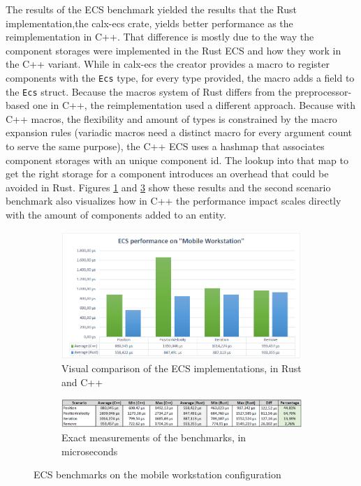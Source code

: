 The results of the \ac{ECS} benchmark yielded the results that the Rust implementation,the calx-ecs crate, yields better performance as the reimplementation in C++. That difference is mostly due to the way the component storages were implemented in the Rust \ac{ECS} and how they work in the C++ variant. While in calx-ecs the creator provides a macro to register components with the \texttt{Ecs} type, for every type provided, the macro adds a field to the \texttt{Ecs} struct. Because the macros system of Rust differs from the preprocessor-based one in C++, the reimplementation used a different approach. Because with C++ macros, the flexibility and amount of types is constrained by the macro expansion rules (variadic macros need a distinct macro for every argument count to serve the same purpose), the C++ \ac{ECS} uses a hashmap that associates component storages with an unique component id. The lookup into that map to get the right storage for a component introduces an overhead that could be avoided in Rust. Figures \ref{fig:ecs_bench_work} and \ref{fig:ecs_bench_blade} show these results and the second scenario benchmark also visualizes how in C++ the performance impact scales directly with the amount of components added to an entity. 

\begin{figure}[h!]
	\centering
	\begin{subfigure}[b]{\textwidth}
		\includegraphics[width=1\linewidth]{PICs/ecs_bench_workstation.png}
		\caption{Visual comparison of the \ac{ECS} implementations, in Rust and C++}
		\label{fig:ecs_bench_work} 
	\end{subfigure}
	
	\begin{subfigure}[b]{\textwidth}
		\includegraphics[width=1\linewidth]{PICs/ecs_bench_workstation_data.png}
		\caption{Exact measurements of the benchmarks, in microseconds}
		\label{fig:ecs_bench_blade}
	\end{subfigure}
	
	\caption[ECS benchmarks workstation]{\ac{ECS} benchmarks on the mobile workstation configuration}
\end{figure}

